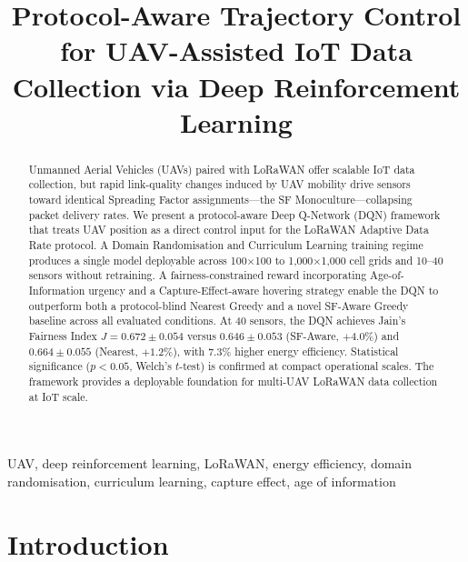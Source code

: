 \documentclass[conference]{IEEEtran}
\begin{document}
\title{Protocol-Aware Trajectory Control for UAV-Assisted IoT Data Collection via Deep Reinforcement Learning}

\author{
}

\maketitle

\begin{abstract}
Unmanned Aerial Vehicles (UAVs) paired with LoRaWAN offer scalable IoT data collection, but rapid link-quality changes induced by UAV mobility drive sensors toward identical Spreading Factor assignments---the SF Monoculture---collapsing packet delivery rates. We present a protocol-aware Deep Q-Network (DQN) framework that treats UAV position as a direct control input for the LoRaWAN Adaptive Data Rate protocol. A Domain Randomisation and Curriculum Learning training regime produces a single model deployable across 100$\times$100 to 1{,}000$\times$1{,}000 cell grids and 10--40 sensors without retraining. A fairness-constrained reward incorporating Age-of-Information urgency and a Capture-Effect-aware hovering strategy enable the DQN to outperform both a protocol-blind Nearest Greedy and a novel SF-Aware Greedy baseline across all evaluated conditions. At 40 sensors, the DQN achieves Jain's Fairness Index $J=0.672\pm0.054$ versus $0.646\pm0.053$ (SF-Aware, $+4.0\%$) and $0.664\pm0.055$ (Nearest, $+1.2\%$), with $7.3\%$ higher energy efficiency. Statistical significance ($p<0.05$, Welch's $t$-test) is confirmed at compact operational scales. The framework provides a deployable foundation for multi-UAV LoRaWAN data collection at IoT scale.
\end{abstract}

\begin{IEEEkeywords}
UAV, deep reinforcement learning, LoRaWAN, energy efficiency, domain randomisation, curriculum learning, capture effect, age of information
\end{IEEEkeywords}

\section{Introduction}
\end{document}
